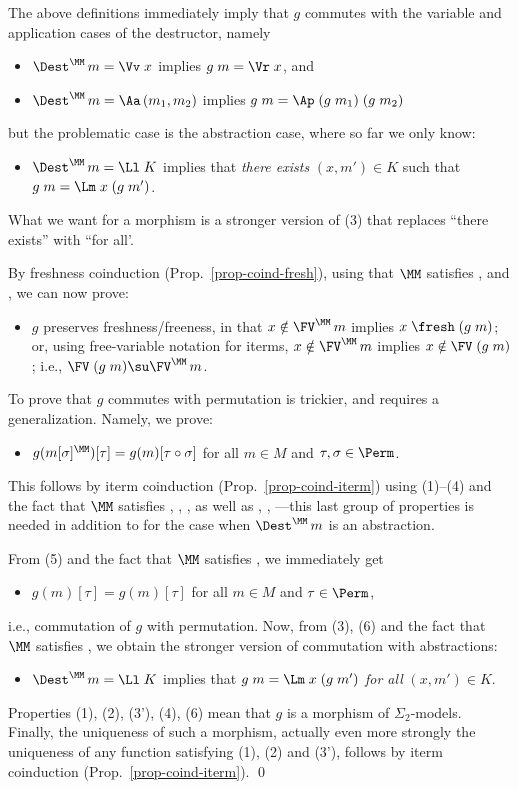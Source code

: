 The above definitions immediately imply that $g$ commutes with the variable and application cases of the destructor, namely
\begin{itemize}
	\item[(1)] $\Dest^\MM\,m = \Vv\;x$ implies $g\;m = \Vr\;x$, and 
	\item[(2)] $\Dest^\MM\,m = \Aa\,(m_1,m_2)$ implies $g\;m = \Ap\;(g\;m_1)\;(g\;m_2)$
\end{itemize}
but the problematic case is the abstraction case, where so far we only know:
\begin{itemize}
	\item[(3)] $\Dest^\MM\,m = \Ll\;K$ implies that \emph{there exists} $(x,m') \in K$ such that $g\;m = \Lm\;x\;(g\;m')$.
\end{itemize}
What we want for a morphism is a stronger version of (3) that replaces ``there exists'' with ``for all'. 

By freshness coinduction (Prop.~\ref{prop-coind-fresh}), using that $\MM$ satisfies \FrVr{}, \FrAp{} and \FrLm{}, we can now prove:
\begin{itemize}
\item[(4)] $g$ preserves freshness/freeness, in that $x \notin \FV^\MM\,m$ implies $x\;\fresh\;(g\;m)$; or, using free-variable notation for iterms, $x \notin \FV^\MM\,m$ implies $x \notin \FV\;(g\;m)$; i.e., 
$\FV\;(g\;m) \su \FV^\MM\,m$. 
\end{itemize}

To prove that $g$ commutes with permutation is trickier, and requires a generalization. Namely, we prove:
\begin{itemize}
	\item[(5)] $g(m[\sigma]^\MM)[\tau] = g(m)[\tau\circ \sigma]$ for all $m\in M$ and $\tau,\sigma\in\Perm$. 
	\end{itemize} 
This follows by iterm coinduction (Prop.~\ref{prop-coind-iterm}) using (1)--(4) and the fact that $\MM$ satisfies \PmVr{}, \PmAp{}, \PmLm{}, as well as  \PmCp{}, \PmFv{}, \PmBvr{}---this last group of properties is needed in addition to \PmLm{} for the case when $\Dest^\MM\,m$ is an abstraction. 

From (5) and the fact that $\MM$ satisfies \PmId{}, we immediately get 
\begin{itemize}
	\item[(6)] $g(m)[\tau] = g(m)[\tau]$ for all $m\in M$ and $\tau\in\Perm$,  
\end{itemize} 
i.e., commutation of $g$ with permutation.  
Now, from (3), (6) and the fact that $\MM$ satisfies \IPmBvr{}, we obtain the stronger version of commutation with abstractions: 
\begin{itemize}
	\item[(3')] $\Dest^\MM\,m = \Ll\;K$ implies that $g\;m = \Lm\;x\;(g\;m')$ \emph{for all} $(x,m') \in K$. 
\end{itemize}
%
Properties (1), (2), (3'), (4), (6) mean that $g$ is a morphism of $\Sigma_2$-models. Finally, the uniqueness of such a morphism, actually even more strongly the uniqueness of any function satisfying (1), (2) and (3'), follows by iterm coinduction (Prop.~\ref{prop-coind-iterm}). 
%
\qed  

